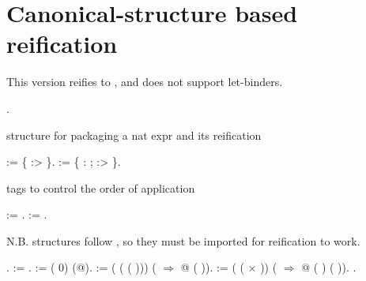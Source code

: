 \begin{coqdoccode}
\end{coqdoccode}
\section{Canonical-structure based reification}

 This version reifies to , and does not support
    let-binders. \begin{coqdoccode}
\coqdocemptyline
\coqdocnoindent
{}  .\coqdoceol
\coqdocemptyline
\end{coqdoccode}
structure for packaging a nat expr and its reification \begin{coqdoccode}
\coqdocemptyline
\coqdocnoindent
{}  :=  \{  :>  \}.\coqdoceol
\coqdocnoindent
{}  :=\coqdoceol
\coqdocindent{1.00em}
 \{  :  ;  :>  \}.\coqdoceol
\coqdocemptyline
\end{coqdoccode}
tags to control the order of application \begin{coqdoccode}
\coqdocemptyline
\coqdocnoindent
{}  := .\coqdoceol
\coqdocnoindent
{}  := .\coqdoceol
\coqdocemptyline
\end{coqdoccode}
N.B.  structures follow , so they must be
    imported for reification to work. \begin{coqdoccode}
\coqdocemptyline
\coqdocnoindent
{}  .\coqdoceol
\coqdocindent{1.00em}
    :=  .\coqdoceol
\coqdocindent{1.00em}
  \coqdoceol
\coqdocindent{2.00em}
:=  ( 0) (@).\coqdoceol
\coqdocindent{1.00em}
   \coqdoceol
\coqdocindent{2.00em}
:=  ( ( ( ))) (  \ensuremath{\Rightarrow} @  (  )).\coqdoceol
\coqdocindent{1.00em}
    \coqdoceol
\coqdocindent{2.00em}
:=  ( (  \ensuremath{\times}  ))\coqdoceol
\coqdocindent{6.50em}
(  \ensuremath{\Rightarrow} @  (  ) (  )).\coqdoceol
\coqdocnoindent
{} .\coqdoceol
\coqdocemptyline
\end{coqdoccode}
